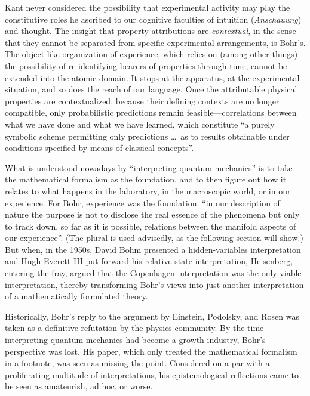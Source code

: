 \documentclass[smallextended]{svjour3}
\begin{document}
Kant never considered the possibility that experimental activity may play the constitutive roles he ascribed to our cognitive faculties of {intuition} (\emph{Anschauung}) and thought. The insight that property attributions are \emph{contextual}, in the sense that they cannot be separated from specific experimental arrangements, is Bohr's. The object-like organization of experience, which relies on (among other things) the possibility of re-identifying bearers of properties through time, cannot be extended into the atomic domain. It stops at the apparatus, at the experimental situation, and so does the reach of our language. Once the attributable physical properties are contextualized, because their defining contexts are no longer compatible, only probabilistic predictions remain feasible---correlations between what we have done and what we have learned, which constitute ``a purely symbolic scheme permitting only predictions \dots\ as to results obtainable under conditions specified by means of classical concepts''.\cite{Bohr-APHKa}

What is understood nowadays by ``interpreting quantum mechanics'' is to take the mathematical formalism as the foundation, and to then figure out how it relates to what happens in the laboratory, in the macroscopic world, or in our experience. For Bohr, experience was the foundation: ``in our description of nature the purpose is not to disclose the real essence of the phenomena but only to track down, so far as it is possible, relations between the manifold aspects of our experience''.\cite{BohrATDNa} (The plural is used advisedly, as the following section will show.) But when, in the 1950s, David Bohm\cite{BohmHV} presented a hidden-variables interpretation and Hugh Everett III\cite{EverettRSF} put forward his relative-state interpretation, Heisenberg,\cite{Heisenberg_PP} entering the fray, argued that the Copenhagen interpretation was the only viable interpretation, thereby transforming Bohr's views into just another interpretation of a mathematically formulated theory. 

Historically, Bohr's reply\cite{BohrEPRreply} to the argument by Einstein, Podolsky, and Rosen\cite{EPR} was taken as a definitive refutation by the physics community. By the time interpreting quantum mechanics had become a growth industry, Bohr's perspective was lost. His paper, which only treated the mathematical formalism in a footnote, was seen as missing the point. Considered on a par with a proliferating multitude of interpretations, his epistemological reflections came to be seen as amateurish, ad hoc, or worse.
\end{document}
